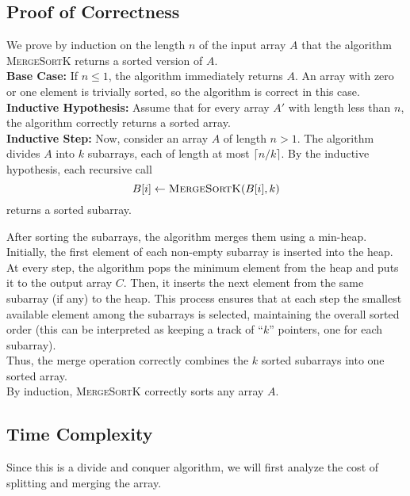 \documentclass[a4paper]{article}
\begin{document}
\subsection*{Proof of Correctness}

We prove by induction on the length $n$ of the input array $A$ that the algorithm \textsc{MergeSortK} returns a sorted version of $A$. \\

\noindent \textbf{Base Case:} If $n \leq 1$, the algorithm immediately returns $A$. An array with zero or one element is trivially sorted, so the algorithm is correct in this case. \\

\noindent \textbf{Inductive Hypothesis:} Assume that for every array $A'$ with length less than $n$, the algorithm correctly returns a sorted array. \\

\noindent \textbf{Inductive Step:} Now, consider an array $A$ of length $n > 1$. The algorithm divides $A$ into $k$ subarrays, each of length at most $\lceil n/k \rceil$. By the inductive hypothesis, each recursive call 
\[
B[i] \gets \textsc{MergeSortK}(B[i], k)
\]
returns a sorted subarray. 

\noindent After sorting the subarrays, the algorithm merges them using a min-heap. Initially, the first element of each non-empty subarray is inserted into the heap. At every step, the algorithm pops the minimum element from the heap and puts it to the output array $C$. Then, it inserts the next element from the same subarray (if any) to the heap. This process ensures that at each step the smallest available element among the subarrays is selected, maintaining the overall sorted order (this can be interpreted as keeping a track of \enquote{$k$} pointers, one for each subarray). \\

\noindent Thus, the merge operation correctly combines the $k$ sorted subarrays into one sorted array. \\

\noindent By induction, \textsc{MergeSortK} correctly sorts any array $A$.


\subsection*{Time Complexity}
Since this is a divide and conquer algorithm, we will first analyze the cost of splitting and merging the array. \\
\end{document}
